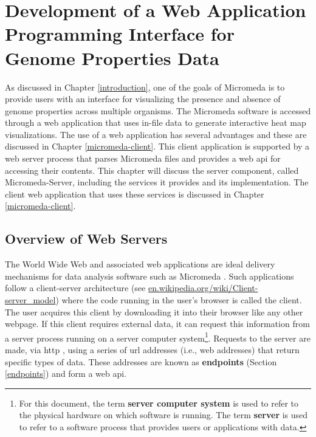 \chapter{Development of a Web Application Programming Interface for Genome Properties Data} \label{micromeda-server}

As discussed in Chapter \ref{introduction}, one of the goals of Micromeda is to provide users with an interface for visualizing the presence and absence of genome properties across multiple organisms. The Micromeda software is accessed through a web application that uses in-file data to generate interactive heat map visualizations. The use of a web application has several advantages and these are discussed in Chapter \ref{micromeda-client}. This client application is supported by a web server process that parses Micromeda files and provides a web \gls{api} for accessing their contents. This chapter will discuss the server component, called Micromeda-Server, including the services it provides and its implementation. The client web application that uses these services is discussed in Chapter \ref{micromeda-client}.

\section{Overview of Web Servers} \label{web-servers}

The World Wide Web and associated web applications are ideal delivery mechanisms for data analysis software such as Micromeda \cite{berners1994world}. Such applications follow a client-server architecture \cite{svobodova1985client} (see \href{http://en.wikipedia.org/wiki/Client-server_model}{en.wikipedia.org/wiki/Client-server\_model}) where the code running in the user's browser is called the client. The user acquires this client by downloading it into their browser like any other webpage. If this client requires external data, it can request this information from a server process running on a server computer system\footnote{For this document, the term \textbf{server computer system} is used to refer to the physical hardware on which software is running. The term \textbf{server} is used to refer to a software process that provides users or applications with data.}. Requests to the server are made, via \gls{http} \cite{fielding1999hypertext}, using a series of \gls{url} addresses \cite{berners1994rfc} (i.e., web addresses) that return specific types of data. These addresses are known as \textbf{endpoints} (Section \ref{endpoints}) and form a web \gls{api}.

